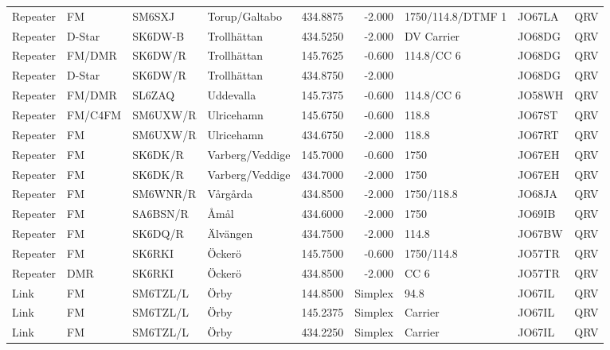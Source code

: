 \begin{landscape}
\begin{longtable}{llllrrlll}
	Repeater & FM              & SM6SXJ   & Torup/Galtabo         &     434.8875 &     -2.000 & 1750/114.8/DTMF 1 & JO67LA      & QRV      \\
	Repeater & D-Star          & SK6DW-B  & Trollhättan           &     434.5250 &     -2.000 & DV Carrier        & JO68DG      & QRV      \\
	Repeater & FM/DMR          & SK6DW/R  & Trollhättan           &     145.7625 &     -0.600 & 114.8/CC 6        & JO68DG      & QRV      \\
	Repeater & D-Star          & SK6DW/R  & Trollhättan           &     434.8750 &     -2.000 &                   & JO68DG      & QRV      \\
	Repeater & FM/DMR          & SL6ZAQ   & Uddevalla             &     145.7375 &     -0.600 & 114.8/CC 6        & JO58WH      & QRV      \\
	Repeater & FM/C4FM         & SM6UXW/R & Ulricehamn            &     145.6750 &     -0.600 & 118.8             & JO67ST      & QRV      \\
	Repeater & FM              & SM6UXW/R & Ulricehamn            &     434.6750 &     -2.000 & 118.8             & JO67RT      & QRV      \\
	Repeater & FM              & SK6DK/R  & Varberg/Veddige       &     145.7000 &     -0.600 & 1750              & JO67EH      & QRV      \\
	Repeater & FM              & SK6DK/R  & Varberg/Veddige       &     434.7000 &     -2.000 & 1750              & JO67EH      & QRV      \\
	Repeater & FM              & SM6WNR/R & Vårgårda              &     434.8500 &     -2.000 & 1750/118.8        & JO68JA      & QRV      \\
	Repeater & FM              & SA6BSN/R & Åmål                  &     434.6000 &     -2.000 & 1750              & JO69IB      & QRV      \\
	Repeater & FM              & SK6DQ/R  & Älvängen              &     434.7500 &     -2.000 & 114.8             & JO67BW      & QRV      \\
	Repeater & FM              & SK6RKI   & Öckerö                &     145.7500 &     -0.600 & 1750/114.8        & JO57TR      & QRV      \\
	Repeater & DMR             & SK6RKI   & Öckerö                &     434.8500 &     -2.000 & CC 6              & JO57TR      & QRV      \\
	Link     & FM              & SM6TZL/L & Örby                  &     144.8500 &    Simplex & 94.8              & JO67IL      & QRV      \\
	Link     & FM              & SM6TZL/L & Örby                  &     145.2375 &    Simplex & Carrier           & JO67IL      & QRV      \\
	Link     & FM              & SM6TZL/L & Örby                  &     434.2250 &    Simplex & Carrier           & JO67IL      & QRV     
\end{longtable}



\end{landscape}

